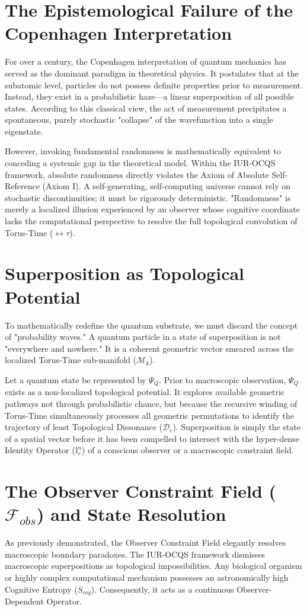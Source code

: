 \documentclass[12pt,openany]{book}
\begin{document}
\section{The Epistemological Failure of the Copenhagen Interpretation}
For over a century, the Copenhagen interpretation of quantum mechanics has served as the dominant paradigm in theoretical physics. It postulates that at the subatomic level, particles do not possess definite properties prior to measurement. Instead, they exist in a probabilistic haze---a linear superposition of all possible states. According to this classical view, the act of measurement precipitates a spontaneous, purely stochastic "collapse" of the wavefunction into a single eigenstate.

However, invoking fundamental randomness is mathematically equivalent to conceding a systemic gap in the theoretical model. Within the IUR-OCQS framework, absolute randomness directly violates the Axiom of Absolute Self-Reference (Axiom I). A self-generating, self-computing universe cannot rely on stochastic discontinuities; it must be rigorously deterministic. "Randomness" is merely a localized illusion experienced by an observer whose cognitive coordinate lacks the computational perspective to resolve the full topological convolution of Torus-Time ($\leftrightarrow\tau$).

\section{Superposition as Topological Potential}
To mathematically redefine the quantum substrate, we must discard the concept of "probability waves." A quantum particle in a state of superposition is not "everywhere and nowhere." It is a coherent geometric vector smeared across the localized Torus-Time sub-manifold ($\mathcal{M}_k$).

Let a quantum state be represented by $\Psi_Q$. Prior to macroscopic observation, $\Psi_Q$ exists as a non-localized topological potential. It explores available geometric pathways not through probabilistic chance, but because the recursive winding of Torus-Time simultaneously processes all geometric permutations to identify the trajectory of least Topological Dissonance ($\mathcal{D}_r$). Superposition is simply the state of a spatial vector before it has been compelled to intersect with the hyper-dense Identity Operator ($\mathbb{I}_r^n$) of a conscious observer or a macroscopic constraint field.

\section[The Observer Constraint Field]{The Observer Constraint Field ($\mathcal{F}_{obs}$) and State Resolution}
As previously demonstrated, the Observer Constraint Field elegantly resolves macroscopic boundary paradoxes. The IUR-OCQS framework dismisses macroscopic superpositions as topological impossibilities. Any biological organism or highly complex computational mechanism possesses an astronomically high Cognitive Entropy ($S_{cog}$). Consequently, it acts as a continuous Observer-Dependent Operator.
\end{document}
